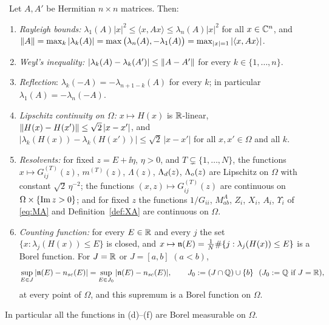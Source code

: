 \begin{lemma}\label{lem:weyl} \infra\
Let $A,A'$ be Hermitian $n\times n$ matrices. Then:
\begin{enumerate}[label=\textup{(\alph*)},leftmargin=2.2em,itemsep=1pt]
\item \emph{Rayleigh bounds:} $\lambda_1(A)|x|^2\le\langle x,Ax\rangle\le\lambda_n(A)|x|^2$ for all $x\in\mathbb{C}^n$, and
$\|A\|=\max_k|\lambda_k(A)|=\max\big(\lambda_n(A),-\lambda_1(A)\big)=\max_{|x|=1}|\langle x,Ax\rangle|$.
\item \emph{Weyl's inequality:} $|\lambda_k(A)-\lambda_k(A')|\le\|A-A'\|$ for every $k\in\{1,\dots,n\}$.
\item \emph{Reflection}: $\lambda_k(-A)=-\lambda_{n+1-k}(A)$ for every $k$; in particular $\lambda_1(A)=-\lambda_n(-A)$.
\item \emph{Lipschitz continuity on $\Omega$:} $x\mapsto H(x)$ is $\mathbb{R}$-linear, $\|H(x)-H(x')\|\le\sqrt2\,|x-x'|$, and $|\lambda_k(H(x))-\lambda_k(H(x'))|\le\sqrt2\,|x-x'|$ for all $x,x'\in\Omega$ and all $k$.
\item \emph{Resolvents:} for fixed $z=E+\ii\eta$, $\eta>0$, and $T\subsetneq\{1,\dots,N\}$, the functions $x\mapsto G^{(T)}_{ij}(z)$, $m^{(T)}(z)$, $\Lambda(z)$, $\Lambda_d(z)$, $\Lambda_o(z)$ are Lipschitz on $\Omega$ with constant $\sqrt2\,\eta^{-2}$;
the functions $(x,z)\mapsto G^{(T)}_{ij}(z)$ are continuous on $\Omega\times\{\operatorname{Im} z>0\}$; and for fixed $z$ the functions $1/G_{ii}$, $M^A_{ab}$, $Z_i$, $X_i$, $A_i$, $\Upsilon_i$ of \eqref{eq:MA} and Definition~\ref{def:XA} are continuous on $\Omega$.
\item \emph{Counting function:} for every $E\in\mathbb{R}$ and every $j$ the set $\{x:\lambda_j(H(x))\le E\}$ is closed, and $x\mapsto\mathfrak{n}(E)=\frac1N\#\{j:\lambda_j(H(x))\le E\}$ is a Borel function. For $J=\mathbb{R}$ or $J=[a,b]$ $(a<b)$,
\[
 \sup_{E\in J}|\fn(E)-\nsc(E)|=\sup_{E\in J_0}|\fn(E)-\nsc(E)|,\qquad J_0:=(J\cap\mathbb Q)\cup\{b\}\ \ (J_0:=\mathbb Q\text{ if }J=\R),
\]
at every point of $\Omega$, and this supremum is a Borel function on $\Omega$.
\end{enumerate}
In particular all the functions in \textup{(d)--(f)} are Borel measurable on $\Omega$.
\end{lemma}
